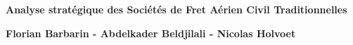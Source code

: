 
\begin{titlepage}
	\parindent=0pt
 
\addtolength{\wpXoffset}{-4.5cm}

	
	\hrulefill
	\begin{center}\bfseries\Huge
		\color{white}
		{Analyse stratégique des Sociétés de Fret Aérien Civil Traditionnelles} 
	\end{center}
	\hrulefill
	
	\vspace*{1cm}
	\begin{center}\bfseries\Large
			\color{white}
		{Florian Barbarin - Abdelkader Beldjilali - Nicolas Holvoet}
		
	\end{center}
	


\end{titlepage}
